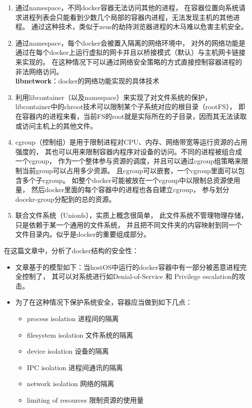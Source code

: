 \documentclass[AutoFakeBold,a4paper]{ctexart}
\begin{document}
\begin{enumerate}
    \item 通过namespace，不同docker容器无法访问其他的进程，
    在容器位置向系统请求进程列表会只能看到少数几个局部的容器内进程，无法发现主机的其他进程。
    通过这种技术，类似于zeus的劫持浏览器进程的木马难以危害主机安全。
    
    \item 通过namespace，每个docker会被置入隔离的网络环境中，
    对外的网络功能是通过在每个docker上运行虚拟的网卡并且以桥接模式（默认）与主机网卡链接来实现的。
    在这种情况下可以通过网络安全策略的方式直接控制容器进程的非法网络访问。\\
    \textbf{libnetwork}：docker的网络功能实现的具体技术
    
    \item 利用libcontainer（以及namespace）来实现了对文件系统的保护，
    libcontainer中的chroot技术可以限制某个子系统对应的根目录（rootFS），
    即在容器内的进程来看，当前FS的root就是实际所在的子目录，因而其无法读取或访问主机上的其他文件。
    
    \item cgroup（控制组）是用于限制进程对CPU、内存、网络带宽等运行资源的占用强度的，
    其也可以用来限制容器内程序对设备的访问。不同的进程被组合成一个cgroup，
    作为一个整体参与资源的调度，并且可以通过cgroup组策略来限制当前group可以占用多少资源。
    且cgroup可以嵌套，一个cgroup里面可以包含多个子cgroup。
    如整个docker可能被放在一个cgroup中以限制总资源使用量，
    然后docker里面的每个容器中的进程也各自建立cgroup，
    参与划分docekr-group分配到的总的资源。
    
    \item 联合文件系统（Unionfs），实质上概念很简单，
    此文件系统不管理物理存储，只是依赖于某一个通用的文件系统，
    并且把不同文件夹的内容映射到同一个文件目录内。似乎是docker的重要组成部分。
\end{enumerate}

在这篇文章中，分析了docker结构的安全性：\cite{bui2015analysis}

\begin{itemize}
    \item 文章基于的模型如下：当hostOS中运行的docker容器中有一部分被恶意进程完全控制了，
    其可以对系统进行如Denial-of-Service 和 Privilege escalation的攻击。
    \item 为了在这种情况下保护系统安全，容器应当做到如下几点：
    \begin{itemize}
        \item process isolation 进程间的隔离
        \item filesystem isolation  文件系统的隔离
        \item device isolation  设备的隔离
        \item IPC isolation 进程间通讯的隔离
        \item network isolation 网络的隔离
        \item limiting of resources 限制资源的使用量
    \end{itemize}
\end{itemize}
\end{document}
